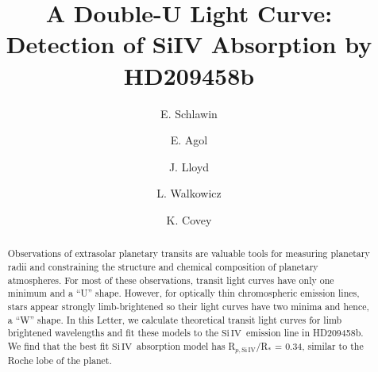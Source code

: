 \documentclass[manuscript]{aastex}
\newcommand{\siIV}{\ensuremath{\mathrm{Si}\,\scriptstyle \mathrm{IV}}}
\begin{document}

\title{A Double-U Light Curve:\\
Detection of SiIV Absorption by HD209458b}


\author{E. Schlawin} 
\author{E. Agol}
\author{J. Lloyd}
\author{L. Walkowicz}
\author{K. Covey}







\begin{abstract}
Observations of extrasolar planetary transits are valuable tools for measuring planetary radii and  constraining the structure and chemical composition of planetary atmospheres. For most of these observations, transit light curves have only one minimum and a  ``U'' shape. However, for optically thin chromospheric emission lines, stars appear strongly limb-brightened so their light curves have two minima and hence, a ``W'' shape. In this Letter, we calculate theoretical transit light curves for limb brightened wavelengths and fit these models to the \siIV\ emission line in HD209458b. We find that the best fit \siIV\ absorption model has R$_{p,\siIV}$/R$_*$ = 0.34, similar to the Roche lobe of the planet.
\end{abstract}
\end{document}
